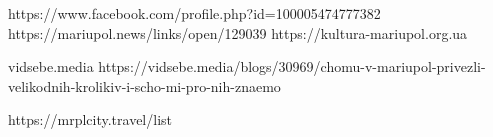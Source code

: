  
 
 
 
 

https://www.facebook.com/profile.php?id=100005474777382
https://mariupol.news/links/open/129039
https://kultura-mariupol.org.ua

vidsebe.media
https://vidsebe.media/blogs/30969/chomu-v-mariupol-privezli-velikodnih-krolikiv-i-scho-mi-pro-nih-znaemo

https://mrplcity.travel/list
